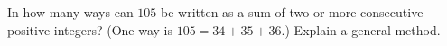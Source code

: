 In how many ways can $105$ be written as a sum of two or more consecutive positive integers? (One way is $105=34+35+36$.) Explain a general method.
